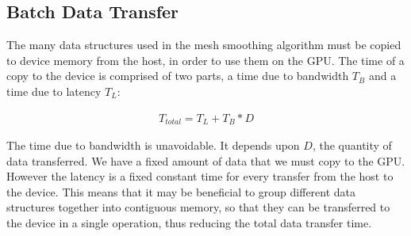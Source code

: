 \subsection{Batch Data Transfer}
The many data structures used in the mesh smoothing algorithm must be copied to device memory from the host, in order to use them on the GPU. The time of a copy to the device is comprised of two parts, a time due to bandwidth \begin{math}T_B\end{math} and a time due to latency \begin{math}T_L\end{math}\cite{transfer2}:

\begin{align*}
T_\mathit{total} = T_L + T_B*D
\end{align*}

The time due to bandwidth is unavoidable. It depends upon \begin{math}D\end{math}, the quantity of data transferred. We have a fixed amount of data that we must copy to the GPU. However the latency is a fixed constant time for every transfer from the host to the device. This means that it may be beneficial to group different data structures together into contiguous memory, so that they can be transferred to the device in a single operation, thus reducing the total data transfer time.